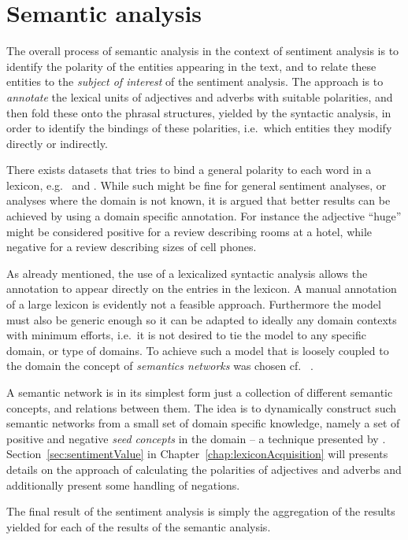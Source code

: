 \section{Semantic analysis}
\label{sec:semanticAnalysis}
The overall process of semantic analysis in the context of sentiment analysis is to identify the polarity of the entities appearing in the text, and to relate these entities to the \emph{subject of interest} of the sentiment analysis. The approach is to \emph{annotate} the lexical units of adjectives and adverbs with suitable polarities, and then fold these onto the phrasal structures, yielded by the syntactic analysis, in order to identify the bindings of these polarities, i.e.\ which entities they modify directly or indirectly.

There exists datasets that tries to bind a general polarity to each word in a lexicon, e.g.\ \cite{sentiWordNet} and \cite{sentiWordNet3}. While such might be fine for general sentiment analyses, or analyses where the domain is not known, it is argued that better results can be achieved by using a domain specific annotation. For instance the adjective ``huge'' might be considered positive for a review describing rooms at a hotel, while negative for a review describing sizes of cell phones.

As already mentioned, the use of a lexicalized syntactic analysis allows the annotation to appear directly on the entries in the lexicon. A manual annotation of a large lexicon is evidently not a feasible approach. Furthermore the model must also be generic enough so it can be adapted to ideally any domain contexts with minimum efforts, i.e.\ it is not desired to tie the model to any specific domain, or type of domains. To achieve such a model that is loosely coupled to the domain the concept of \emph{semantics networks} was chosen cf.\ \citeauthor{ai} .

A semantic network is in its simplest form just a collection of different semantic concepts, and relations between them. The idea is to dynamically construct such semantic networks from a small set of domain specific knowledge, namely a set of positive and negative \emph{seed concepts} in the domain -- a technique presented by \citeauthor{valenceShifting} . Section~\ref{sec:sentimentValue} in Chapter~\ref{chap:lexiconAcquisition} will presents details on the approach of calculating the polarities of adjectives and adverbs and additionally present some handling of negations.

The final result of the sentiment analysis is simply the aggregation of the results yielded for each of the results of the semantic analysis.